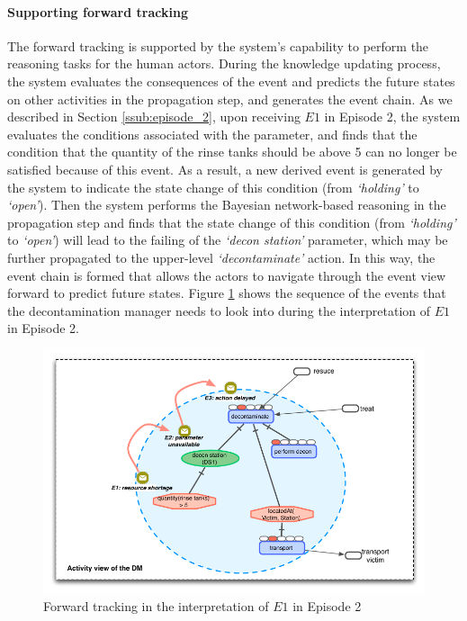 \paragraph*{Supporting forward tracking} %
\label{par:supporting_forward_tracking}
The forward tracking is supported by the system's capability to perform the reasoning tasks for the human actors. During the knowledge updating process, the system evaluates the consequences of the event and predicts the future states on other activities in the propagation step, and generates the event chain. As we described in Section \ref{ssub:episode_2}, upon receiving $E1$ in Episode 2, the system evaluates the conditions associated with the parameter, and finds that the condition that the quantity of the rinse tanks should be above 5 can no longer be satisfied because of this event. As a result, a new derived event is generated by the system to indicate the state change of this condition (from \emph{`holding'} to \emph{`open'}). Then the system performs the Bayesian network-based reasoning in the propagation step and finds that the state change of this condition (from \emph{`holding'} to \emph{`open'}) will lead to the failing of the \emph{`decon station'} parameter, which may be further propagated to the upper-level \emph{`decontaminate'} action. In this way, the event chain is formed that allows the actors to navigate through the event view forward to predict future states. Figure \ref{fig:forward_chain} shows the sequence of the events that the decontamination manager needs to look into during the interpretation of $E1$ in Episode 2.

\begin{figure}[htbp] %
	\centering
	\includegraphics{forward_chain.pdf} 
	\caption{Forward tracking in the interpretation of $E1$ in Episode 2}
	\label{fig:forward_chain}
\end{figure}

